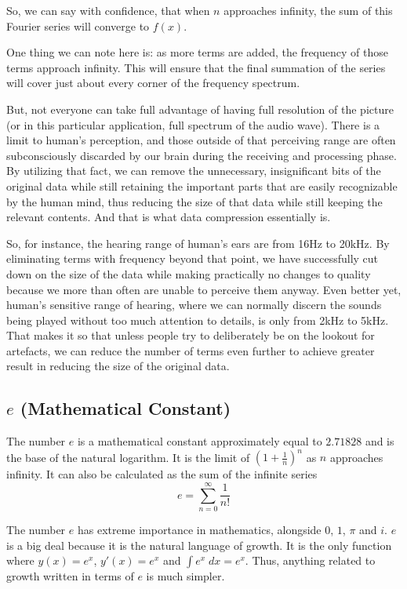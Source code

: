 \documentclass[a4paper]{article}
\begin{document}
	So, we can say with confidence, that when $n$ approaches infinity, the sum of this Fourier series will converge to $f(x)$.
	
	One thing we can note here is: as more terms are added, the frequency of those terms approach infinity. This will ensure that the final summation of the series will cover just about every corner of the frequency spectrum.
	
	But, not everyone can take full advantage of having full resolution of the picture (or in this particular application, full spectrum of the audio wave). There is a limit to human's perception, and those outside of that perceiving range are often subconsciously discarded by our brain during the receiving and processing phase. By utilizing that fact, we can remove the unnecessary, insignificant bits of the original data while still retaining the important parts that are easily recognizable by the human mind, thus reducing the size of that data while still keeping the relevant contents. And that is what data compression essentially is.
	
	So, for instance, the hearing range of human's ears are from 16Hz to 20kHz. By eliminating terms with frequency beyond that point, we have successfully cut down on the size of the data while making practically no changes to quality because we more than often are unable to perceive them anyway. Even better yet, human's sensitive range of hearing, where we can normally discern the sounds being played without too much attention to details, is only from 2kHz to 5kHz. That makes it so that unless people try to deliberately be on the lookout for artefacts, we can reduce the number of terms even further to achieve greater result in reducing the size of the original data. 
	
	\newpage
	\subsection{$\mathit{e}$ (Mathematical Constant)}
	The number $\mathit{e}$ is a mathematical constant approximately equal to $2.71828$ and is the base of the natural logarithm. It is the limit of $(1+\frac{1}{n})^n$ as $n$ approaches infinity. It can also be calculated as the sum of the infinite series
	\begin{equation*}
	\mathit{e} = \sum_{n=0}^{\infty}\frac{1}{n!}
	\end{equation*}
	
	The number $\mathit{e}$ has extreme importance in mathematics, alongside $0$, $1$, $\pi$ and $\mathit{i}$. $\mathit{e}$ is a big deal because it is the natural language of growth. It is the only function where $y(x)=\mathit{e}^x$, $y\prime(x)=\mathit{e}^x$ and $\int \mathit{e}^x\;dx = \mathit{e}^x$. Thus, anything related to growth written in terms of $\mathit{e}$ is much simpler.
	
\end{document}
